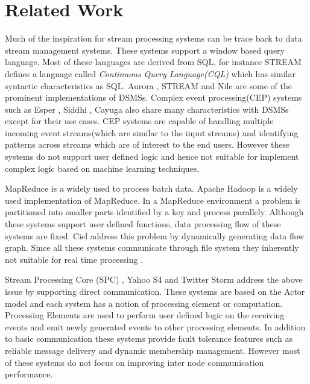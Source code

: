 \section{Related Work}
Much of the inspiration for stream processing systems can be trace back to data stream management systems. These systems support a window based query language. Most of these languages are derived from SQL, for instance STREAM \cite{arasu2004stream} defines a language called \textit{Continuous Query Language(CQL)} which has similar syntactic characteristics as SQL. Aurora \cite{abadi2003aurora}, STREAM \cite{arasu2004stream} and Nile \cite{hammad2004nile} are some of the prominent implementations of DSMSs. Complex event processing(CEP) systems such as Esper \cite{esper}, Siddhi \cite{suhothayan2011siddhi}, Cayuga \cite{brenna2007cayuga} also share many characteristics with DSMSs except for their use cases. CEP systems are capable of handling multiple incoming event streams(which are similar to the input streams) and identifying patterns across streams which are of interest to the end users. However these systems do not support user defined logic and hence not suitable for implement complex logic based on machine learning techniques. 

MapReduce \cite{dean2008mapreduce} is a widely used to process batch data. Apache Hadoop \cite{hadoop} is a widely used implementation of MapReduce. In a MapReduce environment a problem is partitioned into smaller parts identified by a key and process parallely. Although these systems support user defined functions, data processing flow of these systems are fixed. Ciel \cite{murray2011ciel} address this problem by dynamically generating data flow graph. Since all these systems communicate through file system they inherently not suitable for real time processing \cite{lam2012muppet}. 

Stream Processing Core (SPC) \cite{Amini2006}, Yahoo S4 \cite{neumeyer2010s4} and Twitter Storm \cite{twitterStorm} address the above issue by supporting direct communication. These systems are based on the Actor model \cite{agha1985actors} and each system has a notion of processing element or computation. Processing Elements are used to perform user defined logic on the receiving events and emit newly generated events to other processing elements. In addition to basic communication these systems provide fault tolerance features such as reliable message delivery and dynamic membership management. However most of these systems do not focus on improving inter node communication performance.


